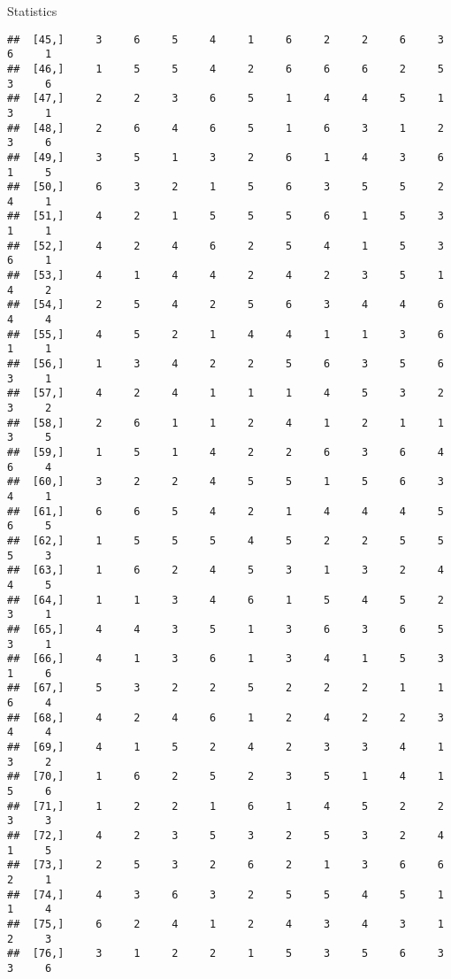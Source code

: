 \documentclass[
  ignorenonframetext,
]{beamer}
\begin{document}
\begin{frame}[fragile]{Statistics}
\begin{verbatim}
##  [45,]     3     6     5     4     1     6     2     2     6     3     6     1
##  [46,]     1     5     5     4     2     6     6     6     2     5     3     6
##  [47,]     2     2     3     6     5     1     4     4     5     1     3     1
##  [48,]     2     6     4     6     5     1     6     3     1     2     3     6
##  [49,]     3     5     1     3     2     6     1     4     3     6     1     5
##  [50,]     6     3     2     1     5     6     3     5     5     2     4     1
##  [51,]     4     2     1     5     5     5     6     1     5     3     1     1
##  [52,]     4     2     4     6     2     5     4     1     5     3     6     1
##  [53,]     4     1     4     4     2     4     2     3     5     1     4     2
##  [54,]     2     5     4     2     5     6     3     4     4     6     4     4
##  [55,]     4     5     2     1     4     4     1     1     3     6     1     1
##  [56,]     1     3     4     2     2     5     6     3     5     6     3     1
##  [57,]     4     2     4     1     1     1     4     5     3     2     3     2
##  [58,]     2     6     1     1     2     4     1     2     1     1     3     5
##  [59,]     1     5     1     4     2     2     6     3     6     4     6     4
##  [60,]     3     2     2     4     5     5     1     5     6     3     4     1
##  [61,]     6     6     5     4     2     1     4     4     4     5     6     5
##  [62,]     1     5     5     5     4     5     2     2     5     5     5     3
##  [63,]     1     6     2     4     5     3     1     3     2     4     4     5
##  [64,]     1     1     3     4     6     1     5     4     5     2     3     1
##  [65,]     4     4     3     5     1     3     6     3     6     5     3     1
##  [66,]     4     1     3     6     1     3     4     1     5     3     1     6
##  [67,]     5     3     2     2     5     2     2     2     1     1     6     4
##  [68,]     4     2     4     6     1     2     4     2     2     3     4     4
##  [69,]     4     1     5     2     4     2     3     3     4     1     3     2
##  [70,]     1     6     2     5     2     3     5     1     4     1     5     6
##  [71,]     1     2     2     1     6     1     4     5     2     2     3     3
##  [72,]     4     2     3     5     3     2     5     3     2     4     1     5
##  [73,]     2     5     3     2     6     2     1     3     6     6     2     1
##  [74,]     4     3     6     3     2     5     5     4     5     1     1     4
##  [75,]     6     2     4     1     2     4     3     4     3     1     2     3
##  [76,]     3     1     2     2     1     5     3     5     6     3     3     6

\end{verbatim}
\end{frame}
\end{document}
